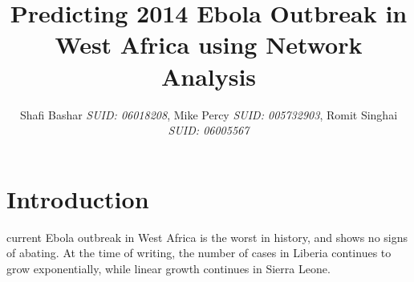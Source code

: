 \documentclass[12pt, journal,onecolumn]{IEEEtran}
\begin{document}
\title{Predicting 2014 Ebola Outbreak in West Africa using Network Analysis}
\author{Shafi Bashar {\em SUID: 06018208}, Mike Percy {\em  SUID: 005732903}, Romit  Singhai {\em  SUID: 06005567}
}
\maketitle

%



\section{Introduction}
\label{sec:introduction}

\bigskip
{} current Ebola outbreak in West Africa is the worst in history, and shows no signs
of abating. At the time of writing, the number of cases in Liberia continues to grow exponentially,
while linear growth continues in Sierra Leone.
\end{document}
